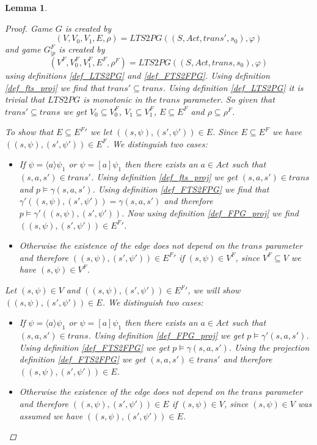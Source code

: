 \documentclass[]{article}
\newtheorem{lemma}[theorem]{Lemma}
\begin{document}
\begin{lemma}
\begin{proof}
Game $G$ is created by 
\[  (V, V_0, V_1, E, \rho) = LTS2PG((S, Act, trans', s_0),\varphi) \]
and game $G_{|p}^F$ is created by 
\[ (V^F, V_0^F, V_1^F, E^F, \rho^F) = LTS2PG((S,Act, trans, s_0), \varphi)\]
 using definitions \ref{def_LTS2PG} and \ref{def_FTS2FPG}. Using definition \ref{def_fts_proj} we find that $trans' \subseteq trans$. Using definition \ref{def_LTS2PG} it is trivial that $LTS2PG$ is monotonic in the $trans$ parameter. So given that $trans' \subseteq trans$ we get $V_0 \subseteq V_0^F$, $V_1 \subseteq V_1^F$, $E \subseteq E^F$ and $\rho \subseteq \rho^F$. 
 
 To show that $E \subseteq {E^F}'$ we let $((s,\psi),(s',\psi')) \in E$. Since $E \subseteq E^F$ we have $((s,\psi),(s',\psi')) \in E^F$. We distinguish two cases:
 \begin{itemize}
 	\item  If $\psi = \langle a \rangle \psi_1$ or $\psi = [a] \psi_1$ then there exists an $a \in Act$ such that $(s,a,s') \in trans'$. Using definition \ref{def_fts_proj} we get $(s,a,s') \in trans$ and $p \models \gamma(s,a,s')$. Using definition \ref{def_FTS2FPG} we find that $\gamma'((s,\psi),(s',\psi')) = \gamma(s,a,s')$ and therefore $p \models \gamma'((s,\psi),(s',\psi'))$. Now using definition \ref{def_FPG_proj} we find $((s,\psi),(s',\psi')) \in {E^F}'$.
 	\item Otherwise the existence of the edge does not depend on the $trans$ parameter and therefore $((s,\psi),(s',\psi')) \in {E^F}'$ if $(s,\psi) \in V^F$, since $V^F \subseteq V$ we have $(s,\psi) \in V^F$.
 \end{itemize}


Let $(s,\psi) \in V$ and $((s,\psi),(s',\psi')) \in {E^F}'$, we will show $((s,\psi),(s',\psi'))\in E$. We distinguish two cases:
\begin{itemize}
	\item If $\psi = \langle a \rangle \psi_1$ or $\psi = [a] \psi_1$ then there exists an $a \in Act$ such that $(s,a,s') \in trans$. Using definition \ref{def_FPG_proj} we get $p \models \gamma'(s,a,s')$. Using definition \ref{def_FTS2FPG} we get $p \models \gamma(s,a,s')$. Using the projection definition \ref{def_FTS2FPG} we get $(s,a,s') \in trans'$ and therefore $((s,\psi),(s',\psi'))\in E$.
	\item Otherwise the existence of the edge does not depend on the $trans$ parameter and therefore $((s,\psi),(s',\psi')) \in E$ if $(s,\psi) \in V$, since $(s,\psi) \in V$ was assumed we have $((s,\psi),(s',\psi')) \in E$.
\end{itemize}
	\end{proof}
\end{lemma}
\end{document}
